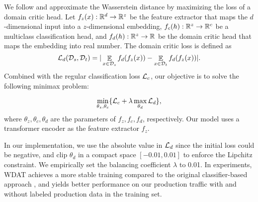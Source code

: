\documentclass[letterpaper]{article} %
\begin{document}
We follow \citet{Shen2018WassersteinDG} and approximate the Wasserstein distance by maximizing the loss of a domain critic head. Let $f_z(x):\mathbb{R}^d \rightarrow \mathbb{R}^z$ be the feature extractor that maps the $d$-dimensional input into a $z$-dimensional embedding, $f_c(h):\mathbb{R}^z \rightarrow \mathbb{R}^c$ be a multiclass classification head, and $f_d(h):\mathbb{R}^z \rightarrow \mathbb{R}$ be the domain critic head that maps the embedding into real number. The domain critic loss is defined as
\begin{equation*}
\mathcal{L}_{d}(\mathcal{D}_s, \mathcal{D}_t) = |\mathop{\mathbb{E}}_{x \in \mathcal{D}_s}f_d(f_z(x)) - \mathop{\mathbb{E}}_{x \in \mathcal{D}_t}f_d(f_z(x))|.
\end{equation*}
Combined with the regular classification loss $\mathcal{L}_c$, our objective is to solve the following minimax problem:

\begin{equation*}
\min_{\theta_z, \theta_c} \{ \mathcal{L}_c + \lambda \max_{\theta_d} \mathcal{L}_{d} \},
\end{equation*}
where $\theta_z, \theta_c, \theta_d$ are the parameters of $f_z, f_c, f_d$, respectively. Our model uses a transformer encoder as the feature extractor $f_z$.

In our implementation, we use the absolute value in $\mathcal{L}_{d}$ since the initial loss could be negative, and clip $\theta_d$ in a compact space $[-0.01, 0.01]$ to enforce the Lipchitz constraint. We empirically set the balancing coefficient $\lambda$ to 0.01. In experiments, WDAT achieves a more stable training compared to the original classifier-based approach \citep{pmlr-v70-arjovsky17a}, and yields better performance on our production traffic with and without labeled production data in the training set.





\end{document}
